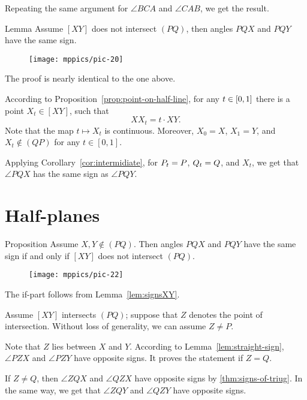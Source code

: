 Repeating the same argument for $\angle BCA$ and $\angle CAB$,
we get the result.
\qeds

\begin{thm}[\abs]{Lemma}\label{lem:signsXY}
Assume $[XY]$ does not intersect $(PQ)$,
then angles $PQX$ and $PQY$ 
have the same sign.
\end{thm}

\begin{wrapfigure}{o}{26mm}
\vskip-4mm
\centering
\texttt{[image: mppics/pic-20]}
\end{wrapfigure}

The proof is nearly identical to the one above.

According to Proposition~\ref{prop:point-on-half-line},
for any $t\in [0,1]$ there is a point  $X_t\in[XY]$, 
such that 
\[XX_t= t\cdot XY.\]
Note that the map $t\mapsto X_t$ is continuous.
Moreover, $X_0=X$, $X_1=Y$, and $X_t\notin(QP)$ for any $t\in [0,1]$.

Applying Corollary~\ref{cor:intermidiate},
for $P_t=P$, $Q_t=Q$, and $X_t$, we get that
$\angle PQX$ has the same sign as $\angle PQY$.
\qeds

\section{Half-planes}

\begin{thm}{Proposition}\label{prop:half-plane}
Assume $X,Y\notin(PQ)$.
Then angles $PQX$ and $PQY$ have the same sign if and only if $[XY]$ does not intersect $(PQ)$.
\end{thm}

\begin{wrapfigure}{o}{30mm}
\texttt{[image: mppics/pic-22]}
\centering
\end{wrapfigure}

 The if-part follows from Lemma~\ref{lem:signsXY}. 

Assume $[XY]$ intersects $(PQ)$;
suppose that $Z$ denotes the point of intersection.
Without loss of generality, we can assume $Z\ne P$.

Note that $Z$ lies between $X$ and $Y$.
According to Lemma~\ref{lem:straight-sign}, $\angle PZX$ and $\angle PZY$ have opposite signs.
It proves the statement if $Z=Q$.

If $Z\ne Q$, then $\angle ZQX$ and $\angle QZX$ have opposite signs by \ref{thm:signs-of-triug}.
In the same way, we get that $\angle ZQY$ and $\angle QZY$ have opposite signs.


